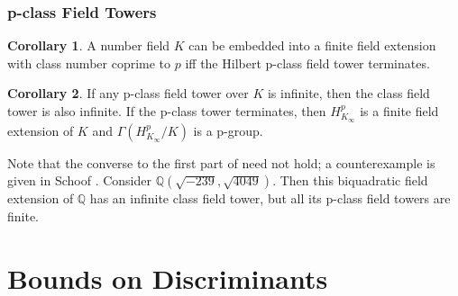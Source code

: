 \documentclass[12pt]{extarticle}
\newcommand{\Q}{\mathbb{Q}}
\newcommand{\<}{\langle}
\renewcommand{\>}{\rangle}
\theoremstyle{definition}
\newtheorem{corollary}{Corollary}
\begin{document}
\subsubsection{ p-class Field Towers }
\begin{corollary}
 A number field $K$ can be embedded into a finite field extension with class number coprime to $p$ iff the Hilbert p-class field tower terminates.
\end{corollary}
\begin{corollary}
If any p-class field tower over $K$ is infinite, then the class field tower is also infinite. If the p-class tower terminates, then $H_{K_\infty}^{p}$ is a finite field extension of $K$ and $\Gamma(H_{K_\infty}^{p}/K)$ is a p-group. \label{cor:p-class}
\end{corollary}
Note that the converse to the first part of  need not hold; a counterexample is given in Schoof \cite{SCHO}. Consider $\Q\left(\sqrt{-239},\sqrt{4049}\right)$. Then this biquadratic field extension of $\Q$ has an infinite class field tower, but all its p-class field towers are finite.
\section{Bounds on Discriminants}
\end{document}
